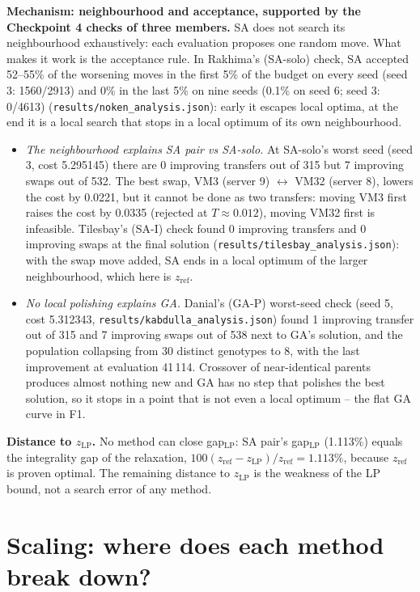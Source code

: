 \documentclass[11pt,a4paper]{article}
\newcommand{\zref}{z_{\mathrm{ref}}}
\newcommand{\zLP}{z_{\mathrm{LP}}}
\begin{document}
\begin{sloppypar}\textbf{Mechanism: neighbourhood and acceptance, supported by the Checkpoint 4 checks of three members.} SA does not search its neighbourhood exhaustively: each evaluation proposes one random move. What makes it work is the acceptance rule. In Rakhima's (SA-solo) check, SA accepted 52--55\% of the worsening moves in the first 5\% of the budget on every seed (seed 3: 1560/2913) and 0\% in the last 5\% on nine seeds (0.1\% on seed 6; seed 3: 0/4613) (\texttt{results/noken\_analysis.json}): early it escapes local optima, at the end it is a local search that stops in a local optimum of its own neighbourhood.
\begin{itemize}[leftmargin=*,itemsep=1pt]
\item \emph{The neighbourhood explains SA pair vs SA-solo.} At SA-solo's worst seed (seed 3, cost 5.295145) there are 0 improving transfers out of 315 but 7 improving swaps out of 532. The best swap, VM3 (server 9) $\leftrightarrow$ VM32 (server 8), lowers the cost by 0.0221, but it cannot be done as two transfers: moving VM3 first raises the cost by 0.0335 (rejected at $T\approx0.012$), moving VM32 first is infeasible. Tilesbay's (SA-I) check found 0 improving transfers and 0 improving swaps at the final solution (\texttt{results/tilesbay\_analysis.json}): with the swap move added, SA ends in a local optimum of the larger neighbourhood, which here is $\zref$.
\item \emph{No local polishing explains GA.} Danial's (GA-P) worst-seed check (seed 5, cost 5.312343, \texttt{results/kabdulla\_analysis.json}) found 1 improving transfer out of 315 and 7 improving swaps out of 538 next to GA's solution, and the population collapsing from 30 distinct genotypes to 8, with the last improvement at evaluation 41\,114. Crossover of near-identical parents produces almost nothing new and GA has no step that polishes the best solution, so it stops in a point that is not even a local optimum -- the flat GA curve in F1.
\end{itemize}\end{sloppypar}

\textbf{Distance to $\zLP$.} No method can close gap$_{\mathrm{LP}}$: SA pair's gap$_{\mathrm{LP}}$ (1.113\%) equals the integrality gap of the relaxation, $100(\zref-\zLP)/\zref=1.113\%$, because $\zref$ is proven optimal. The remaining distance to $\zLP$ is the weakness of the LP bound, not a search error of any method.

\section{Scaling: where does each method break down?}
\end{document}
